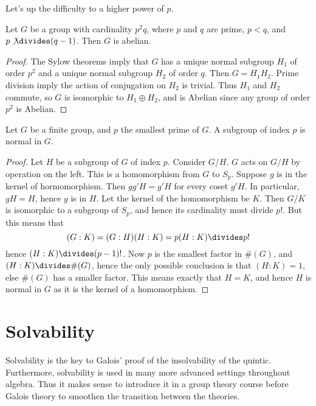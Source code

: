 Let's up the difficulty to a higher power of $p$.

\begin{theorem}
    Let $G$ be a group with cardinality $p^2q$, where $p$ and $q$ are prime, $p < q$, and $p \not \divides (q-1)$. Then $G$ is abelian.
\end{theorem}
\begin{proof}
    The Sylow theorems imply that $G$ has a unique normal subgroup $H_1$ of order $p^2$ and a unique normal subgroup $H_2$ of order $q$. Then $G = H_1H_2$. Prime division imply the action of conjugation on $H_2$ is trivial. Thus $H_1$ and $H_2$ commute, so $G$ is isomorphic to $H_1 \oplus H_2$, and is Abelian since any group of order $p^2$ is Abelian.
\end{proof}

\begin{theorem}
    Let $G$ be a finite group, and $p$ the smallest prime of $G$. A subgroup of index $p$ is normal in $G$.
\end{theorem}
\begin{proof}
    Let $H$ be a subgroup of $G$ of index $p$. Consider $G/H$. $G$ acts on $G/H$ by operation on the left. This is a homomorphism from $G$ to $S_p$. Suppose $g$ is in the kernel of hormomorphism. Then $gg'H = g'H$ for every coset $g'H$. In particular, $gH = H$, hence $g$ is in $H$. Let the kernel of the homomorphism be $K$. Then $G/K$ is isomorphic to a subgroup of $S_p$, and hence its cardinality must divide $p!$. But this means that
    \[ (G:K) = (G:H)(H:K) = p(H:K) \divides p! \]
    hence $(H:K) \divides (p-1)!$. Now $p$ is the smallest factor in $\#(G)$, and $(H:K) \divides \#(G)$, hence the only possible conclusion is that $(H:K) = 1$, else $\#(G)$ has a smaller factor. This means exactly that $H = K$, and hence $H$ is normal in $G$ as it is the kernel of a homomorphism.
\end{proof}









\chapter{Solvability}

Solvability is the key to Galois' proof of the insolvability of the quintic. Furthermore, solvability is used in many more advanced settings throughout algebra. Thus it makes sense to introduce it in a group theory course before Galois theory to smoothen the transition between the theories.


